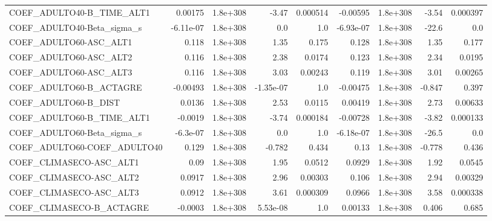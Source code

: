\begin{tabular}{lrrrrrrrr}
COEF\_ADULTO40-B\_TIME\_ALT1         &     0.00175 &     1.8e+308 &     -3.47 & 0.000514 &   -0.00595 &    1.8e+308 &        -3.54 &      0.000397 \\
COEF\_ADULTO40-Beta\_sigma\_s        &   -6.11e-07 &     1.8e+308 &       0.0 &      1.0 &  -6.93e-07 &    1.8e+308 &        -22.6 &           0.0 \\
COEF\_ADULTO60-ASC\_ALT1            &       0.118 &     1.8e+308 &      1.35 &    0.175 &      0.128 &    1.8e+308 &         1.35 &         0.177 \\
COEF\_ADULTO60-ASC\_ALT2            &       0.116 &     1.8e+308 &      2.38 &   0.0174 &      0.123 &    1.8e+308 &         2.34 &        0.0195 \\
COEF\_ADULTO60-ASC\_ALT3            &       0.116 &     1.8e+308 &      3.03 &  0.00243 &      0.119 &    1.8e+308 &         3.01 &       0.00265 \\
COEF\_ADULTO60-B\_ACTAGRE           &    -0.00493 &     1.8e+308 & -1.35e-07 &      1.0 &   -0.00475 &    1.8e+308 &       -0.847 &         0.397 \\
COEF\_ADULTO60-B\_DIST              &      0.0136 &     1.8e+308 &      2.53 &   0.0115 &    0.00419 &    1.8e+308 &         2.73 &       0.00633 \\
COEF\_ADULTO60-B\_TIME\_ALT1         &     -0.0019 &     1.8e+308 &     -3.74 & 0.000184 &   -0.00728 &    1.8e+308 &        -3.82 &      0.000133 \\
COEF\_ADULTO60-Beta\_sigma\_s        &    -6.3e-07 &     1.8e+308 &       0.0 &      1.0 &  -6.18e-07 &    1.8e+308 &        -26.5 &           0.0 \\
COEF\_ADULTO60-COEF\_ADULTO40       &       0.129 &     1.8e+308 &    -0.782 &    0.434 &       0.13 &    1.8e+308 &       -0.778 &         0.436 \\
COEF\_CLIMASECO-ASC\_ALT1           &        0.09 &     1.8e+308 &      1.95 &   0.0512 &     0.0929 &    1.8e+308 &         1.92 &        0.0545 \\
COEF\_CLIMASECO-ASC\_ALT2           &      0.0917 &     1.8e+308 &      2.96 &  0.00303 &      0.106 &    1.8e+308 &         2.94 &       0.00329 \\
COEF\_CLIMASECO-ASC\_ALT3           &      0.0912 &     1.8e+308 &      3.61 & 0.000309 &     0.0966 &    1.8e+308 &         3.58 &      0.000338 \\
COEF\_CLIMASECO-B\_ACTAGRE          &     -0.0003 &     1.8e+308 &  5.53e-08 &      1.0 &    0.00133 &    1.8e+308 &        0.406 &         0.685 \\

\end{tabular}
